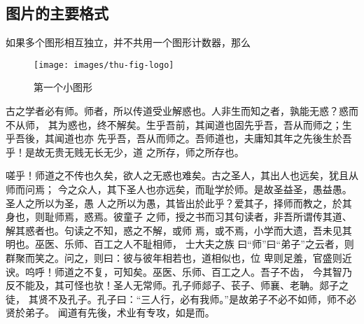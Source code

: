 \documentclass{scuthesis}
\begin{document}
\subsection{图片的主要格式}
如果多个图形相互独立，并不共用一个图形计数器，那么

\begin{figure}[h]
  \centering%
    \texttt{[image: images/thu-fig-logo]}
    \caption{第一个小图形}
\end{figure}

古之学者必有师。师者，所以传道受业解惑也。人非生而知之者，孰能无惑？惑而不从师，
其为惑也，终不解矣。生乎吾前，其闻道也固先乎吾，吾从而师之；生乎吾後，其闻道也亦
先乎吾，吾从而师之。吾师道也，夫庸知其年之先後生於吾乎！是故无贵无贱无长无少，道
之所存，师之所存也。

嗟乎！师道之不传也久矣，欲人之无惑也难矣。古之圣人，其出人也远矣，犹且从师而问焉；
今之众人，其下圣人也亦远矣，而耻学於师。是故圣益圣，愚益愚。圣人之所以为圣，愚
人之所以为愚，其皆出於此乎？爱其子，择师而教之，於其身也，则耻师焉，惑焉。彼童子
之师，授之书而习其句读者，非吾所谓传其道、解其惑者也。句读之不知，惑之不解，或师
焉，或不焉，小学而大遗，吾未见其明也。巫医、乐师、百工之人不耻相师，  士大夫之族
曰“师”曰“弟子”之云者，则群聚而笑之。问之，则曰：彼与彼年相若也，道相似也，位
卑则足羞，官盛则近谀。呜呼！师道之不复，可知矣。巫医、乐师、百工之人。吾子不齿，
今其智乃反不能及，其可怪也欤！圣人无常师。孔子师郯子、苌子、师襄、老聃。郯子之徒，
其贤不及孔子。孔子曰：“三人行，必有我师。”是故弟子不必不如师，师不必贤於弟子。
闻道有先後，术业有专攻，如是而。



\begin{appendix}
	
\end{appendix}
\end{document}
